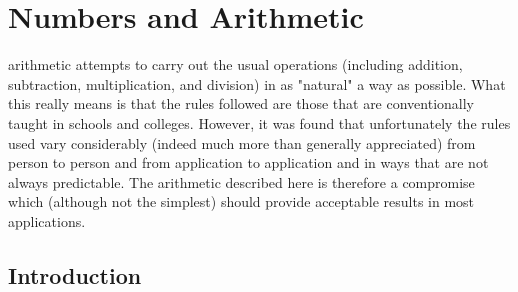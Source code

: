\section{Numbers and Arithmetic}\label{refnums}
 \nr{} arithmetic attempts to carry out the usual operations
(including addition, subtraction, multiplication, and division) in as
"natural" a way as possible.
What this really means is that the rules followed are those that are
conventionally taught in schools and colleges.
However, it was found that unfortunately the rules used vary
considerably (indeed much more than generally appreciated) from person
to person and from application to application and in ways that are not
always predictable.
The \nr{} arithmetic described here is therefore a compromise which
(although not the simplest) should provide acceptable results in most
applications.
\subsection{Introduction}\label{arithintro}
 
